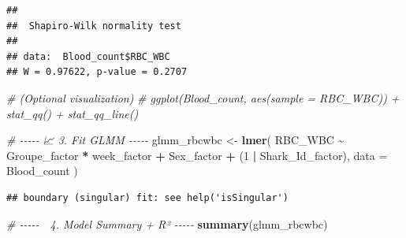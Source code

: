 \documentclass[
]{article}
\newenvironment{Shaded}{\begin{snugshade}}{\end{snugshade}}
\newcommand{\AttributeTok}[1]{\textcolor[rgb]{0.13,0.29,0.53}{#1}}
\newcommand{\CommentTok}[1]{\textcolor[rgb]{0.56,0.35,0.01}{\textit{#1}}}
\newcommand{\DecValTok}[1]{\textcolor[rgb]{0.00,0.00,0.81}{#1}}
\newcommand{\FunctionTok}[1]{\textcolor[rgb]{0.13,0.29,0.53}{\textbf{#1}}}
\newcommand{\NormalTok}[1]{#1}
\newcommand{\OtherTok}[1]{\textcolor[rgb]{0.56,0.35,0.01}{#1}}
\newcommand{\SpecialCharTok}[1]{\textcolor[rgb]{0.81,0.36,0.00}{\textbf{#1}}}
\begin{document}
\begin{verbatim}
## 
##  Shapiro-Wilk normality test
## 
## data:  Blood_count$RBC_WBC
## W = 0.97622, p-value = 0.2707
\end{verbatim}

\begin{Shaded}
\begin{Highlighting}[]
\CommentTok{\# (Optional visualization)}
\CommentTok{\# ggplot(Blood\_count, aes(sample = RBC\_WBC)) + stat\_qq() + stat\_qq\_line()}

\CommentTok{\# {-}{-}{-}{-}{-} 📈 3. Fit GLMM {-}{-}{-}{-}{-}}
\NormalTok{glmm\_rbcwbc }\OtherTok{\textless{}{-}} \FunctionTok{lmer}\NormalTok{(}
\NormalTok{  RBC\_WBC }\SpecialCharTok{\textasciitilde{}}\NormalTok{ Groupe\_factor }\SpecialCharTok{*}\NormalTok{ week\_factor }\SpecialCharTok{+}\NormalTok{ Sex\_factor }\SpecialCharTok{+}\NormalTok{ (}\DecValTok{1} \SpecialCharTok{|}\NormalTok{ Shark\_Id\_factor),}
  \AttributeTok{data =}\NormalTok{ Blood\_count}
\NormalTok{)}
\end{Highlighting}
\end{Shaded}

\begin{verbatim}
## boundary (singular) fit: see help('isSingular')
\end{verbatim}

\begin{Shaded}
\begin{Highlighting}[]
\CommentTok{\# {-}{-}{-}{-}{-} 📄 4. Model Summary + R² {-}{-}{-}{-}{-}}
\FunctionTok{summary}\NormalTok{(glmm\_rbcwbc)}
\end{Highlighting}
\end{Shaded}
\end{document}
